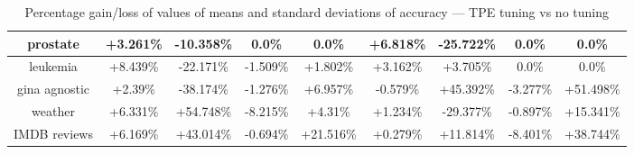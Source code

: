 \documentclass[magisterska, english]{pwr_wmat_praca_dyplomowa}
\theoremstyle{plain}
\numberwithin{theorem}{chapter}
\theoremstyle{definition}
\numberwithin{theorem}{chapter}
\begin{document}
\begin{sidewaystable}
\begin{tabular}{c|cccccccc}
prostate & +3.261\% & -10.358\% & 0.0\% & 0.0\% & +6.818\% & -25.722\% & 0.0\% & 0.0\%\\ \hline
leukemia & +8.439\% & -22.171\% & -1.509\% & +1.802\% & +3.162\% & +3.705\% & 0.0\% & 0.0\%\\ \hline
gina agnostic & +2.39\% & -38.174\% & -1.276\% & +6.957\% & -0.579\% & +45.392\% & -3.277\% & +51.498\%\\ \hline
weather & +6.331\% & +54.748\% & -8.215\% & +4.31\% & +1.234\% & -29.377\% & -0.897\% & +15.341\%\\ \hline
IMDB reviews & +6.169\% & +43.014\% & -0.694\% & +21.516\% & +0.279\% & +11.814\% & -8.401\% & +38.744\%\\ \hline
\end{tabular}
\caption{Percentage gain/loss of values of means and standard deviations of accuracy --- TPE tuning vs no tuning}
\label{tab:no_tuning_tpe_accuracy_diff}


\end{sidewaystable}
\end{document}
